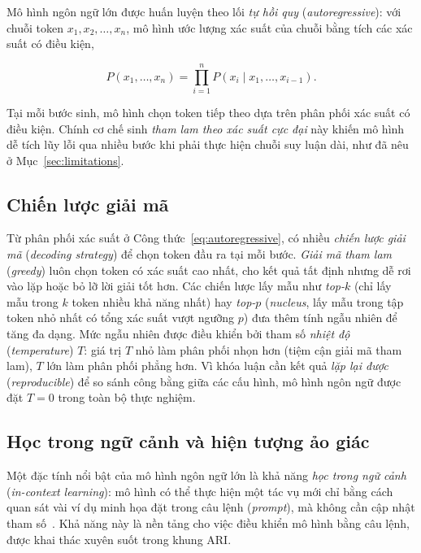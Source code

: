 Mô hình ngôn ngữ lớn được huấn luyện theo lối \textit{tự hồi quy} (\textit{autoregressive}): với
chuỗi token $x_1, x_2, \dots, x_n$, mô hình ước lượng xác suất của chuỗi bằng tích các xác suất
có điều kiện,

\begin{equation}
\label{eq:autoregressive}
P(x_1, \dots, x_n) = \prod_{i=1}^{n} P(x_i \mid x_1, \dots, x_{i-1}).
\end{equation}

Tại mỗi bước sinh, mô hình chọn token tiếp theo dựa trên phân phối xác suất có điều kiện. Chính
cơ chế sinh \textit{tham lam theo xác suất cực đại} này khiến mô hình dễ tích lũy lỗi qua nhiều
bước khi phải thực hiện chuỗi suy luận dài, như đã nêu ở Mục~\ref{sec:limitations}.

\subsection{Chiến lược giải mã}

Từ phân phối xác suất ở Công thức~\eqref{eq:autoregressive}, có nhiều \textit{chiến lược giải mã}
(\textit{decoding strategy}) để chọn token đầu ra tại mỗi bước. \textit{Giải mã tham lam}
(\textit{greedy}) luôn chọn token có xác suất cao nhất, cho kết quả tất định nhưng dễ rơi vào lặp
hoặc bỏ lỡ lời giải tốt hơn. Các chiến lược lấy mẫu như \textit{top-$k$} (chỉ lấy mẫu trong $k$
token nhiều khả năng nhất) hay \textit{top-$p$} (\textit{nucleus}, lấy mẫu trong tập token nhỏ
nhất có tổng xác suất vượt ngưỡng $p$) đưa thêm tính ngẫu nhiên để tăng đa dạng. Mức ngẫu nhiên
được điều khiển bởi tham số \textit{nhiệt độ} (\textit{temperature}) $T$: giá trị $T$ nhỏ làm phân
phối nhọn hơn (tiệm cận giải mã tham lam), $T$ lớn làm phân phối phẳng hơn. Vì khóa luận cần kết
quả \emph{lặp lại được} (\textit{reproducible}) để so sánh công bằng giữa các cấu hình, mô hình
ngôn ngữ được đặt $T = 0$ trong toàn bộ thực nghiệm.

\subsection{Học trong ngữ cảnh và hiện tượng ảo giác}

Một đặc tính nổi bật của mô hình ngôn ngữ lớn là khả năng \textit{học trong ngữ cảnh}
(\textit{in-context learning}): mô hình có thể thực hiện một tác vụ mới chỉ bằng cách quan sát
vài ví dụ minh họa đặt trong câu lệnh (\textit{prompt}), mà không cần cập nhật tham
số~\cite{zhao2023llmsurvey}. Khả năng này là nền tảng cho việc điều khiển mô hình bằng câu lệnh,
được khai thác xuyên suốt trong khung ARI.

